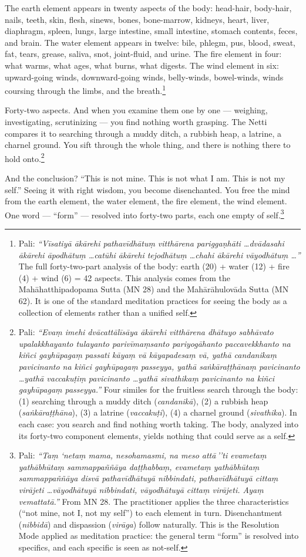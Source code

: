 The earth element appears in twenty aspects of the body: head-hair, body-hair, nails, teeth, skin, flesh, sinews, bones, bone-marrow, kidneys, heart, liver, diaphragm, spleen, lungs, large intestine, small intestine, stomach contents, feces, and brain. The water element appears in twelve: bile, phlegm, pus, blood, sweat, fat, tears, grease, saliva, snot, joint-fluid, and urine. The fire element in four: what warms, what ages, what burns, what digests. The wind element in six: upward-going winds, downward-going winds, belly-winds, bowel-winds, winds coursing through the limbs, and the breath.\footnote{Pali: \textit{``Vīsatiyā ākārehi pathavīdhātuṃ vitthārena pariggaṇhāti \ldots dvādasahi ākārehi āpodhātuṃ \ldots catūhi ākārehi tejodhātuṃ \ldots chahi ākārehi vāyodhātuṃ \ldots''} The full forty-two-part analysis of the body: earth (20) + water (12) + fire (4) + wind (6) = 42 aspects. This analysis comes from the Mahāhatthipadopama Sutta (MN 28) and the Mahārāhulovāda Sutta (MN 62). It is one of the standard meditation practices for seeing the body as a collection of elements rather than a unified self.}

Forty-two aspects. And when you examine them one by one --- weighing, investigating, scrutinizing --- you find nothing worth grasping. The Netti compares it to searching through a muddy ditch, a rubbish heap, a latrine, a charnel ground. You sift through the whole thing, and there is nothing there to hold onto.\footnote{Pali: \textit{``Evaṃ imehi dvācattālīsāya ākārehi vitthārena dhātuyo sabhāvato upalakkhayanto tulayanto parivīmaṃsanto pariyogāhanto paccavekkhanto na kiñci gayhūpagaṃ passati kāyaṃ vā kāyapadesaṃ vā, yathā candanikaṃ pavicinanto na kiñci gayhūpagaṃ passeyya, yathā saṅkāraṭṭhānaṃ pavicinanto \ldots yathā vaccakuṭiṃ pavicinanto \ldots yathā sivathikaṃ pavicinanto na kiñci gayhūpagaṃ passeyya.''} Four similes for the fruitless search through the body: (1) searching through a muddy ditch (\textit{candanikā}), (2) a rubbish heap (\textit{saṅkāraṭṭhāna}), (3) a latrine (\textit{vaccakuṭi}), (4) a charnel ground (\textit{sivathika}). In each case: you search and find nothing worth taking. The body, analyzed into its forty-two component elements, yields nothing that could serve as a self.}

And the conclusion? ``This is not mine. This is not what I am. This is not my self.'' Seeing it with right wisdom, you become disenchanted. You free the mind from the earth element, the water element, the fire element, the wind element. One word --- ``form'' --- resolved into forty-two parts, each one empty of self.\footnote{Pali: \textit{``Taṃ `netaṃ mama, nesohamasmi, na meso attā\,''ti evametaṃ yathābhūtaṃ sammappaññāya daṭṭhabbaṃ, evametaṃ yathābhūtaṃ sammappaññāya disvā pathavīdhātuyā nibbindati, pathavīdhātuyā cittaṃ virājeti \ldots vāyodhātuyā nibbindati, vāyodhātuyā cittaṃ virājeti. Ayaṃ vemattatā.''} From MN 28. The practitioner applies the three characteristics (``not mine, not I, not my self'') to each element in turn. Disenchantment (\textit{nibbidā}) and dispassion (\textit{virāga}) follow naturally. This is the Resolution Mode applied as meditation practice: the general term ``form'' is resolved into specifics, and each specific is seen as not-self.}


